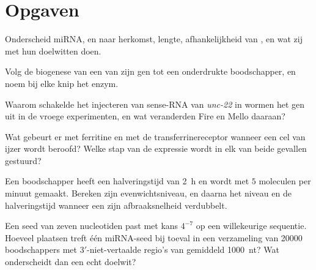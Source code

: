 \section{Opgaven}

\begin{exercise}[$\star$]\label{exo:b3:rna-regulation:1}
Onderscheid miRNA,  en  naar herkomst, lengte, afhankelijkheid
van , en wat zij met hun doelwitten doen.
\end{exercise}

\begin{exercise}[$\star$]\label{exo:b3:rna-regulation:2}
Volg de biogenese van een  van zijn gen tot een onderdrukte
boodschapper, en noem bij elke knip het enzym.
\end{exercise}

\begin{exercise}[$\star$]\label{exo:b3:rna-regulation:3}
Waarom schakelde het injecteren van sense-RNA van \emph{unc-22} in
wormen het gen uit in de vroege experimenten, en wat veranderden Fire
en Mello daaraan?
\end{exercise}

\begin{exercise}[$\star$]\label{exo:b3:rna-regulation:4}
Wat gebeurt er met ferritine en met de transferrinereceptor wanneer
een cel van ijzer wordt beroofd? Welke stap van de expressie wordt in
elk van beide gevallen gestuurd?
\end{exercise}

\begin{exercise}[$\star\star$]\label{exo:b3:rna-regulation:5}
Een boodschapper heeft een halveringstijd van \qty{2}{h} en wordt met
$5$ moleculen per minuut gemaakt. Bereken zijn evenwichtsniveau, en
daarna het niveau en de halveringstijd wanneer een  zijn
afbraaksnelheid verdubbelt.
\end{exercise}

\begin{exercise}[$\star\star$]\label{exo:b3:rna-regulation:6}
Een seed van zeven nucleotiden past met kans $4^{-7}$ op een
willekeurige sequentie. Hoeveel plaatsen treft één miRNA-seed bij
toeval in een verzameling van \num{20000} boodschappers met
3$'$-niet-vertaalde regio's van gemiddeld \qty{1000}{nt}? Wat
onderscheidt dan een echt doelwit?
\end{exercise}

